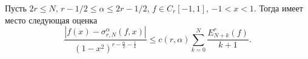 \begin{theorem}\label{soblegtheo3}
Пусть $2r\le N$, $r-1/2\le \alpha\le 2r-1/2$, $f\in C_r[-1,1]$, $-1<x<1$. Тогда имеет место следующая оценка
\begin{equation}\label{sobleg-5.25}
 \frac{|f(x)-\sigma_{r,N}^\alpha(f,x)|}
{(1-x^2)^{r-\frac{\alpha}{2}-\frac14}}\le c(r,\alpha)\sum_{k=0}^N\frac{E_{N+k}^r(f)}{k+1}.
 \end{equation}
\end{theorem}

%
